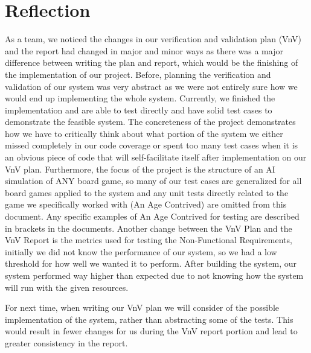 \documentclass[12pt, titlepage]{article}
\begin{document}
\section{Reflection}
As a team, we noticed the changes in our verification and validation plan (VnV) and the report had changed in major and minor ways as there was a major difference between writing the plan and report, which would be the finishing of the implementation of our project. Before, planning the verification and validation of our system was very abstract as we were not entirely sure how we would end up implementing the whole system. Currently, we finished the implementation and are able to test directly and have solid test cases to demonstrate the feasible system. The concreteness of the project demonstrates how we have to critically think about what portion of the system we either missed completely in our code coverage or spent too many test cases when it is an obvious piece of code that will self-facilitate itself after implementation on our VnV plan. Furthermore, the focus of the project is the structure of an AI simulation of ANY board game, so many of our test cases are generalized for all board games applied to the system and any unit tests directly related to the game we specifically worked with (An Age Contrived) are omitted from this document. Any specific examples of An Age Contrived for testing are described in brackets in the documents. Another change between the VnV Plan and the VnV Report is the metrics used for testing the Non-Functional Requirements, initially we did not know the performance of our system, so we had a low threshold for how well we wanted it to perform. After building the system, our system performed way higher than expected due to not knowing how the system will run with the given resources. 
    
    For next time, when writing our VnV plan we will consider of the possible implementation of the system, rather than abstracting some of the tests. This would result in fewer changes for us during the VnV report portion and lead to greater consistency in the report.




\end{document}
